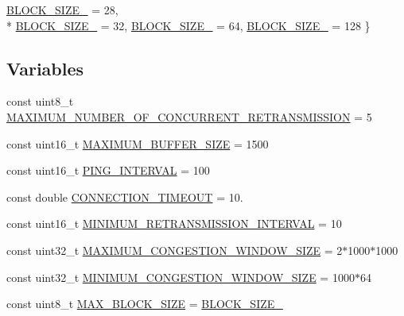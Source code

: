 \begin{DoxyCompactItemize}
\hyperlink{namespace_network_coding_1_1_parameter_a28b92ccd4fb04190653869f4438eee1faa9bbe7b34848168d6462e8e9ddb3cf5c}{B\+L\+O\+C\+K\+\_\+\+S\+I\+Z\+E\+\_} = 28, 
\\*
\hyperlink{namespace_network_coding_1_1_parameter_a28b92ccd4fb04190653869f4438eee1fa0c3c394af5678bb425d4e256ce7bd1e2}{B\+L\+O\+C\+K\+\_\+\+S\+I\+Z\+E\+\_} = 32, 
\hyperlink{namespace_network_coding_1_1_parameter_a28b92ccd4fb04190653869f4438eee1fabf4a9bef39a8d7af7b6ad595987bce95}{B\+L\+O\+C\+K\+\_\+\+S\+I\+Z\+E\+\_} = 64, 
\hyperlink{namespace_network_coding_1_1_parameter_a28b92ccd4fb04190653869f4438eee1fa5305ad9c323e0c393aa49b9f6000bde9}{B\+L\+O\+C\+K\+\_\+\+S\+I\+Z\+E\+\_} = 128
 \}
\end{DoxyCompactItemize}
\subsection*{Variables}
\begin{DoxyCompactItemize}
\item 
const uint8\+\_\+t \hyperlink{namespace_network_coding_1_1_parameter_a9a7439b44c4178484ade74a3eff863e1}{M\+A\+X\+I\+M\+U\+M\+\_\+\+N\+U\+M\+B\+E\+R\+\_\+\+O\+F\+\_\+\+C\+O\+N\+C\+U\+R\+R\+E\+N\+T\+\_\+\+R\+E\+T\+R\+A\+N\+S\+M\+I\+S\+S\+I\+ON} = 5
\item 
const uint16\+\_\+t \hyperlink{namespace_network_coding_1_1_parameter_a459e2143b7087feb87c81650c4418fb5}{M\+A\+X\+I\+M\+U\+M\+\_\+\+B\+U\+F\+F\+E\+R\+\_\+\+S\+I\+ZE} = 1500
\item 
const uint16\+\_\+t \hyperlink{namespace_network_coding_1_1_parameter_aac717e068a7f4c5516073e94ef454b0b}{P\+I\+N\+G\+\_\+\+I\+N\+T\+E\+R\+V\+AL} = 100
\item 
const double \hyperlink{namespace_network_coding_1_1_parameter_a89affbeeb79142af6d45a47083a868e7}{C\+O\+N\+N\+E\+C\+T\+I\+O\+N\+\_\+\+T\+I\+M\+E\+O\+UT} = 10.
\item 
const uint16\+\_\+t \hyperlink{namespace_network_coding_1_1_parameter_ad8178c8021f7e03275b8c769037b705c}{M\+I\+N\+I\+M\+U\+M\+\_\+\+R\+E\+T\+R\+A\+N\+S\+M\+I\+S\+S\+I\+O\+N\+\_\+\+I\+N\+T\+E\+R\+V\+AL} = 10
\item 
const uint32\+\_\+t \hyperlink{namespace_network_coding_1_1_parameter_a6f14145da096c85769462193db39b2ad}{M\+A\+X\+I\+M\+U\+M\+\_\+\+C\+O\+N\+G\+E\+S\+T\+I\+O\+N\+\_\+\+W\+I\+N\+D\+O\+W\+\_\+\+S\+I\+ZE} = 2$\ast$1000$\ast$1000
\item 
const uint32\+\_\+t \hyperlink{namespace_network_coding_1_1_parameter_aa000b3a38c10ed4049bc919cc11bc26a}{M\+I\+N\+I\+M\+U\+M\+\_\+\+C\+O\+N\+G\+E\+S\+T\+I\+O\+N\+\_\+\+W\+I\+N\+D\+O\+W\+\_\+\+S\+I\+ZE} = 1000$\ast$64
\item 
const uint8\+\_\+t \hyperlink{namespace_network_coding_1_1_parameter_af1113bda7e0db18d36f7ac968d8a7e51}{M\+A\+X\+\_\+\+B\+L\+O\+C\+K\+\_\+\+S\+I\+ZE} = \hyperlink{namespace_network_coding_1_1_parameter_a28b92ccd4fb04190653869f4438eee1fa5305ad9c323e0c393aa49b9f6000bde9}{B\+L\+O\+C\+K\+\_\+\+S\+I\+Z\+E\+\_}
\end{DoxyCompactItemize}


